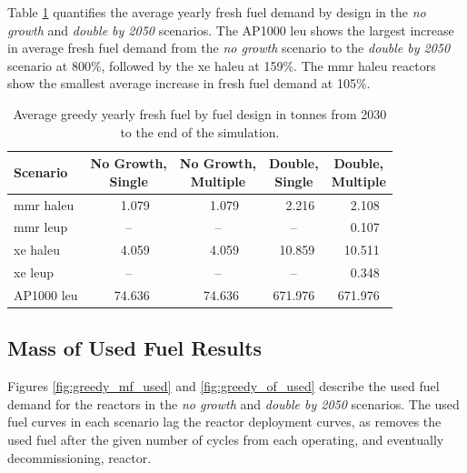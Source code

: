 Table \ref{tab:greedy_fresh_avg} quantifies the average yearly fresh fuel demand by design in the \textit{no growth} and \textit{double by 2050} scenarios. The AP1000 \gls{leu} shows the largest increase in average fresh fuel demand from the \textit{no growth} scenario to the \textit{double by 2050} scenario at 800\%, followed by the \gls{xe} \gls{haleu} at 159\%. The \gls{mmr} \gls{haleu} reactors show the smallest average increase in fresh fuel demand at 105\%.


\begin{table}[H]
  \centering
  \caption{Average greedy yearly fresh fuel by fuel design in tonnes from 2030 to the end of the simulation.}
  \label{tab:greedy_fresh_avg}
  \begin{tabular}{l c c c c}
     \toprule
     Scenario & \shortstack{No Growth,\\ Single} & \shortstack{No Growth,\\ Multiple} & \shortstack{Double,\\ Single} & \shortstack{Double,\\ Multiple}  \\
     \midrule
     \gls{mmr} \gls{haleu}   & \textcolor{white}{00}1.079    & \textcolor{white}{00}1.079   & \textcolor{white}{00}2.216    & \textcolor{white}{00}2.108    \\
     \gls{mmr} \gls{leup}    & --       & --      & --       & \textcolor{white}{00}0.107    \\
     \gls{xe} \gls{haleu}    & \textcolor{white}{00}4.059    & \textcolor{white}{00}4.059   & \textcolor{white}{0}10.859   & \textcolor{white}{0}10.511   \\
     \gls{xe} \gls{leup}     & --       & --      & --       & \textcolor{white}{00}0.348    \\
     AP1000 \gls{leu}        & \textcolor{white}{0}74.636   & \textcolor{white}{0}74.636  & 671.976  & 671.976  \\
     \hline
  \end{tabular}
\end{table}



\subsection{Mass of Used Fuel Results}
\label{sec:greedy_used}

Figures \ref{fig:greedy_mf_used} and \ref{fig:greedy_of_used} describe the used fuel demand for the reactors in the \textit{no growth} and \textit{double by 2050} scenarios. The used fuel curves in each scenario lag the reactor deployment curves, as \cyclus removes the used fuel after the given number of cycles from each operating, and eventually decommissioning, reactor.

